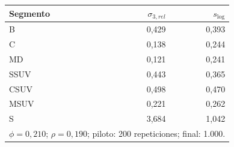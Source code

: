 \begin{tabular}{lrr}
\toprule
Segmento & $\sigma_{3,rel}$ & $s_{\log}$ \\
\midrule
B & 0,429 & 0,393 \\
C & 0,138 & 0,244 \\
MD & 0,121 & 0,241 \\
SSUV & 0,443 & 0,365 \\
CSUV & 0,498 & 0,470 \\
MSUV & 0,221 & 0,262 \\
S & 3,684 & 1,042 \\
\midrule
\multicolumn{3}{l}{\footnotesize $\phi=0,210$; $\rho=0,190$; piloto: 200 repeticiones; final: 1.000.} \\
\bottomrule
\end{tabular}
